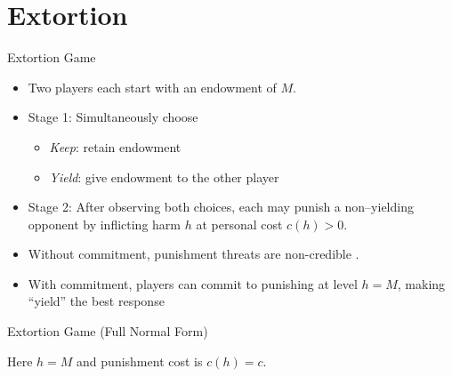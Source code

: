 \documentclass[Output/slides.tex]{subfiles}
\begin{document}
\section{Extortion}
\begin{frame}{Extortion Game}
  \begin{itemize}
    \item Two players each start with an endowment of \(M\).
    \item Stage 1: Simultaneously choose
      \begin{itemize}
        \item \emph{Keep}: retain endowment
        \item \emph{Yield}: give endowment to the other player
      \end{itemize}
    \item Stage 2: After observing both choices, each may punish a non–yielding opponent by inflicting harm \(h\) at personal cost \(c(h)>0\).
    \item Without commitment, punishment threats are non-credible .
    \item With commitment, players can commit to punishing at level \(h=M\), making “yield” the best response 
  \end{itemize}
\end{frame}
\begin{frame}{Extortion Game (Full Normal Form)}
  \centering
  \vspace{1ex}

  {\small Here $h = M$ and punishment cost is $c(h)=c$.}
\end{frame}
\end{document}
